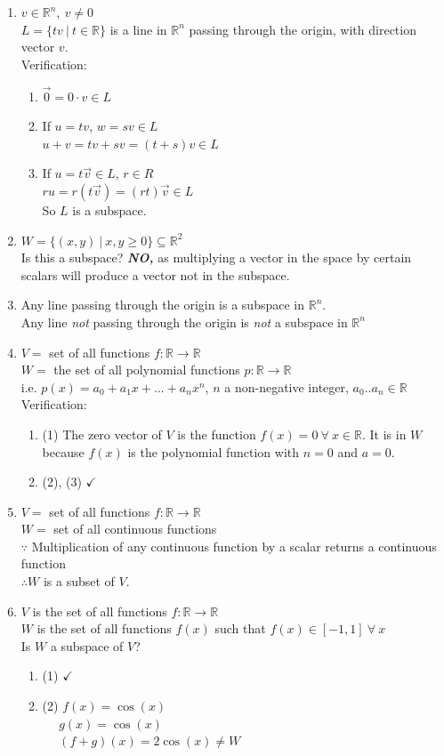 \documentclass[]{article}
\begin{document}
\begin{enumerate}
			\item $v\in\mathbb{R}^n,~v\ne 0$\\
			$L=\{ tv~|~t\in\mathbb{R} \}$ is a line in $\mathbb{R}^n$ passing through the origin, with direction vector $v$.\\
			Verification:
			\begin{enumerate}
				\item $\vec{0}=0\cdot v\in L$
				\item If $u=tv$, $w=sv\in L$\\
				$u+v=tv+sv=(t+s)v\in L$
				\item If $u=t\vec{v}\in L$, $r\in R$\\
				$ru=r(t\vec{v})=(rt)\vec{v}\in L$\\
				So $L$ is a subspace.
			\end{enumerate}
			\item $W=\{(x,y)~|~x,y\ge 0\}\subseteq\mathbb{R}^2$\\
			Is this a subspace? \emph{\bf NO,} as multiplying a vector in the space by certain scalars will produce a vector not in the subspace.
			\item Any line passing through the origin is a subspace in $\mathbb{R}^n$.\\
			Any line \emph{not} passing through the origin is \emph{not} a subspace in $\mathbb{R}^n$
			\item $V=$ set of all functions $f:\mathbb{R}\rightarrow\mathbb{R}$\\
			$W=$ the set of all polynomial functions $p:\mathbb{R}\rightarrow\mathbb{R}$\\
			i.e. $p(x)=a_0+a_1x+...+a_nx^n$, $n$ a non-negative integer, $a_0..a_n\in\mathbb{R}$\\
			Verification:
			\begin{enumerate}
				\item (1) The zero vector of $V$ is the function $f(x)=0~\forall~x\in\mathbb{R}$. It is in $W$ because $f(x)$ is the polynomial function with $n=0$ and $a=0$.
				\item (2), (3) $\checkmark$
			\end{enumerate}
			\item $V=$ set of all functions $f:\mathbb{R}\rightarrow\mathbb{R}$\\
			$W=$ set of all continuous functions\\
			$\because$ Multiplication of any continuous function by a scalar returns a continuous function\\
			$\therefore W$ is a subset of $V$.
			\item $V$ is the set of all functions $f:\mathbb{R}\rightarrow\mathbb{R}$\\
			$W$ is the set of all functions $f(x)$ such that $f(x)\in[-1,1]~\forall~x$\\
			Is $W$ a subspace of $V$?
			\begin{enumerate}
				\item (1) $\checkmark$
				\item (2) $f(x)=\cos(x)$\\
				$~~~~~~g(x)=\cos(x)$\\
				$~~~~~~(f+g)(x)=2\cos(x)\ne W$
			\end{enumerate}
		\end{enumerate}
\end{document}
